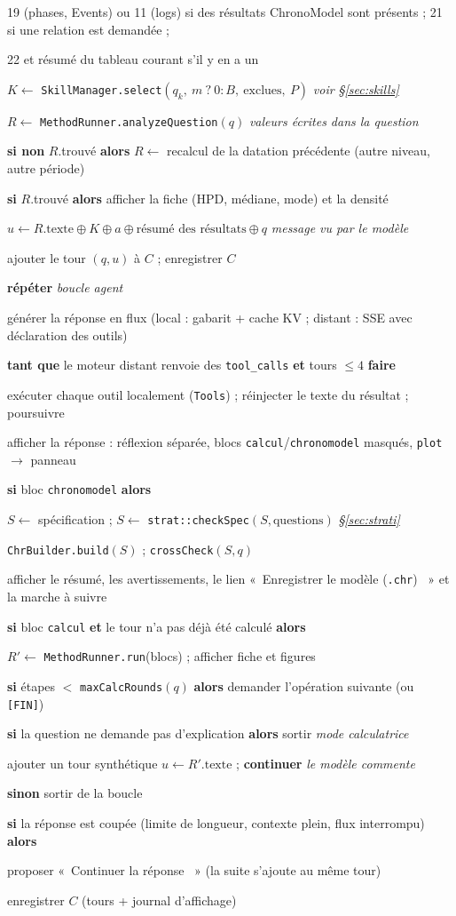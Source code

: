 \documentclass[11pt,a4paper]{article}
\providecommand{\og}{«~}\providecommand{\fg}{\unskip~»}
\newcommand{\code}[1]{\texttt{\small #1}}
\newcounter{algl}
\newlength{\algind}\setlength{\algind}{1.2em}
\newenvironment{algo}{%
  \begin{list}{\scriptsize\arabic{algl}}{\usecounter{algl}%
    \setlength{\itemsep}{0pt}\setlength{\parsep}{0pt}\setlength{\topsep}{2pt}%
    \setlength{\leftmargin}{2.2em}\setlength{\labelwidth}{1.6em}\small}}%
  {\end{list}}
\newcommand{\Li}[2]{\item\hspace*{#1\algind}#2}
\newcommand{\Kw}[1]{\textbf{#1}}
\newcommand{\Com}[1]{\hfill{\color{gray}\textit{\footnotesize #1}}}
\begin{document}
\begin{algorithme}[tbp]
\begin{algo}
\Li1{19 (phases, Events) ou 11 (logs) si des résultats ChronoModel sont présents ; 21 si une relation est demandée ;}
\Li1{22 et résumé du tableau courant s'il y en a un}
\Li0{$K \leftarrow$ \code{SkillManager.select}$(q_k,\ m\ ?\ 0 : B,\ \text{exclues},\ P)$ \Com{voir §\ref{sec:skills}}}
\Li0{$R \leftarrow$ \code{MethodRunner.analyzeQuestion}$(q)$ \Com{valeurs écrites dans la question}}
\Li0{\Kw{si non} $R$.trouvé \Kw{alors} $R \leftarrow$ recalcul de la datation précédente (autre niveau, autre période)}
\Li0{\Kw{si} $R$.trouvé \Kw{alors} afficher la fiche (HPD, médiane, mode) et la densité}
\Li0{$u \leftarrow R.\text{texte} \oplus K \oplus a \oplus \text{résumé des résultats} \oplus q$
  \Com{message vu par le modèle}}
\Li0{ajouter le tour $(q, u)$ à $C$ ; enregistrer $C$}
\Li0{\Kw{répéter} \Com{boucle agent}}
\Li1{générer la réponse en flux (local : gabarit + cache KV ; distant : SSE avec déclaration des outils)}
\Li1{\Kw{tant que} le moteur distant renvoie des \code{tool\_calls} \Kw{et} tours $\le 4$ \Kw{faire}}
\Li2{exécuter chaque outil localement (\code{Tools}) ; réinjecter le texte du résultat ; poursuivre}
\Li1{afficher la réponse : réflexion séparée, blocs \code{calcul}/\code{chronomodel} masqués, \code{plot} $\rightarrow$
  panneau}
\Li1{\Kw{si} bloc \code{chronomodel} \Kw{alors}}
\Li2{$S \leftarrow$ spécification ; $S \leftarrow$ \code{strat::checkSpec}$(S, \text{questions})$
  \Com{§\ref{sec:strati}}}
\Li2{\code{ChrBuilder.build}$(S)$ ; \code{crossCheck}$(S, q)$}
\Li2{afficher le résumé, les avertissements, le lien \og Enregistrer le modèle (\code{.chr}) \fg{} et la marche à
  suivre}
\Li1{\Kw{si} bloc \code{calcul} \Kw{et} le tour n'a pas déjà été calculé \Kw{alors}}
\Li2{$R' \leftarrow$ \code{MethodRunner.run}(blocs) ; afficher fiche et figures}
\Li2{\Kw{si} étapes $<$ \code{maxCalcRounds}$(q)$ \Kw{alors} demander l'opération suivante (ou \code{[FIN]})}
\Li2{\Kw{si} la question ne demande pas d'explication \Kw{alors} sortir \Com{mode calculatrice}}
\Li2{ajouter un tour synthétique $u \leftarrow R'.\text{texte}$ ; \Kw{continuer} \Com{le modèle commente}}
\Li1{\Kw{sinon} sortir de la boucle}
\Li0{\Kw{si} la réponse est coupée (limite de longueur, contexte plein, flux interrompu) \Kw{alors}}
\Li1{proposer \og Continuer la réponse \fg{} (la suite s'ajoute au même tour)}
\Li0{enregistrer $C$ (tours + journal d'affichage)}
\end{algo}
\end{algorithme}
\end{document}
